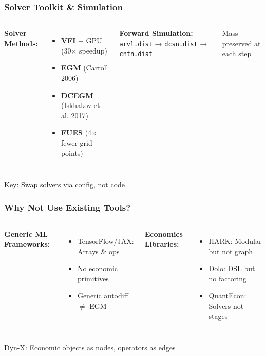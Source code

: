 \documentclass[10pt]{beamer}
\begin{document}
\begin{frame}
  \frametitle{Solver Toolkit \& Simulation}
  \begin{columns}[T]
    \textbf{Solver Methods:}
    \begin{itemize}
      \item \textbf{VFI} + GPU (30× speedup)
      \item \textbf{EGM} (Carroll 2006)
      \item \textbf{DCEGM} (Iskhakov et al. 2017)
      \item \textbf{FUES} (4× fewer grid points)
    \end{itemize}
    
    \textbf{Forward Simulation:}
    \small
    \texttt{arvl.dist} → \texttt{dcsn.dist} → \texttt{cntn.dist}
    
    \vspace{0.5em}
    Mass preserved at each step
  \end{columns}
  
  \vspace{0.5em}
  \begin{block}{Key: Swap solvers via config, not code}
  \end{block}
\end{frame}



\begin{frame}
  \frametitle{Why Not Use Existing Tools?}
  
  \begin{columns}[T]
    \textbf{Generic ML Frameworks:}
    \begin{itemize}
      \item TensorFlow/JAX: Arrays \& ops
      \item No economic primitives
      \item Generic autodiff $\neq$ EGM
    \end{itemize}
    
    \textbf{Economics Libraries:}
    \begin{itemize}
      \item HARK: Modular but not graph
      \item Dolo: DSL but no factoring
      \item QuantEcon: Solvers not stages
    \end{itemize}
  \end{columns}
  
  \vspace{0.5em}
  \begin{block}{Dyn-X: Economic objects as nodes, operators as edges}
  \end{block}
\end{frame}
\end{document}
